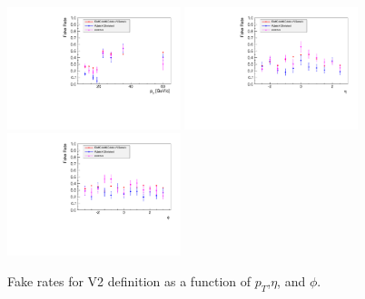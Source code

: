 \begin{figure}[!htbp]
\begin{center}
\includegraphics[width=0.45\textwidth]{figures/ElectronFakeRate_DenominatorV2_ptThreshold15_Pt.pdf}
\includegraphics[width=0.45\textwidth]{figures/ElectronFakeRate_DenominatorV2_ptThreshold15_Eta.pdf}
\includegraphics[width=0.45\textwidth]{figures/ElectronFakeRate_DenominatorV2_ptThreshold15_Phi.pdf}
\caption{Fake rates for V2 definition as a function of $p_T$,$\eta$, and $\phi$.}
\label{fig:ele_fr_V2_jet15}
\end{center}
\end{figure}

